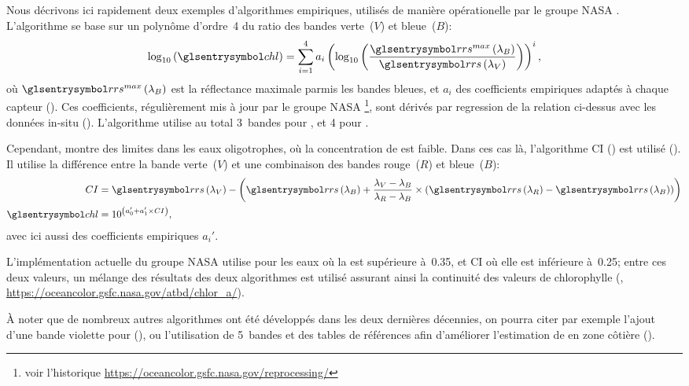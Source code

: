 \begin{technique}
Nous décrivons ici rapidement deux exemples d'algorithmes empiriques, utilisés de manière opérationelle par le groupe NASA .
L'algorithme  se base sur un polynôme d'ordre~4 du ratio des bandes verte~(\(V\)) et bleue~(\(B\)):
\begin{equation} \label{eq:ocx}
  \log_{10}\paren{\am{chl}} =
  \sum_{i=1}^{4} a_i \paren{\log_{10}\paren{
      \frac{ \am{rrs}^{max}\paren{\lambda_B} }
           { \am{rrs}\paren{\lambda_V} }
    }}^i ,
\end{equation}
où \(\am{rrs}^{max}\paren{\lambda_B}\) est la réflectance maximale parmis les bandes bleues, et \(a_i\) des coefficients empiriques adaptés à chaque capteur (\cite{oreilly_1998,oreilly_2000}).
Ces coefficients, régulièrement mis à jour par le groupe NASA \footnote{voir l'historique \url{https://oceancolor.gsfc.nasa.gov/reprocessing/}}, sont dérivés par regression de la relation ci-dessus avec les données in-situ  (\cite{werdell_2005}).
L'algorithme utilise au total 3~bandes pour , et 4 pour .

Cependant,  montre des limites dans les eaux oligotrophes, où la concentration de  est faible.
Dans ces cas là, l'algorithme CI () est utilisé (\cite{hu_2012}).
Il utilise la différence entre la bande verte~(\(V\)) et une combinaison des bandes rouge~(\(R\)) et bleue~(\(B\)):
\begin{equation}
  \label{eq:CI}
  \begin{split}
    CI &= \am{rrs}\paren{\lambda_V} -
         \paren{
          \am{rrs}\paren{\lambda_B}
          + \frac {\lambda_V - \lambda_B}
                  {\lambda_R - \lambda_B}
          \times \paren{\am{rrs}\paren{\lambda_R}
                      - \am{rrs}\paren{\lambda_B}}
         }
    \\
    \am{chl} &= 10^{\paren{a_0' + a_1' \times CI}},
  \end{split}
\end{equation}
avec ici aussi des coefficients empiriques \(a_i'\).

L'implémentation actuelle du groupe NASA  utilise  pour les eaux où la  est supérieure à~\qty{0.35}{\mgm}, et CI où elle est inférieure à~\qty{0.25}{\mgm}; entre ces deux valeurs, un mélange des résultats des deux algorithmes est utilisé assurant ainsi la continuité des valeurs de chlorophylle (\cite{oreilly_2019}, \url{https://oceancolor.gsfc.nasa.gov/atbd/chlor_a/}).

À noter que de nombreux autres algorithmes ont été développés dans les deux dernières décennies, on pourra citer par exemple l'ajout d'une bande violette pour  (\cite{oreilly_2019}), ou l'utilisation de 5~bandes et des tables de références afin d'améliorer l'estimation de  en zone côtière (\cite{gohin_2002}).
\end{technique}

